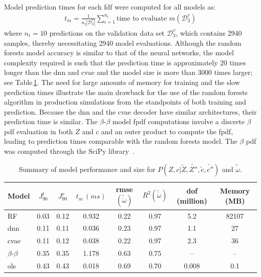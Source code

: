 \documentclass[review]{elsarticle}
\newcommand{\wt}[1]{\widetilde{#1}}
\begin{document}
Model prediction times for each \gls{fdf} were computed for all
models as:
\begin{align}
  \label{eq:predict}
  t_m = \frac{1}{n_t |\mathcal{D}_3^v|} \sum_{i=1}^{n_t} \text{time to evaluate } m(\mathcal{D}_3^v)
\end{align}
where $n_t=10$ predictions on the validation data set
$\mathcal{D}_3^v$, which contains 2940 samples, thereby necessitating
2940 model evaluations. Although the random forests model accuracy is
similar to that of the neural networks, the model complexity required
is such that the prediction time is approximately 20 times longer than
the \gls{dnn} and \gls{cvae} and the model size is more than 3000 times
larger; see Table\,\ref{tab:summary}. The need for large amounts of memory
for training and the slow prediction times illustrate the main
drawback for the use of the random forests algorithm in production
simulations from the standpoints of both training and prediction. Because the
\gls{dnn} and the \gls{cvae} decoder have similar architectures, their
prediction time is similar. The $\beta$-$\beta$ model 
\gls{fpdf} computations involve a discrete $\beta$ \gls{pdf} evaluation
in both $Z$ and $c$ and an outer product to compute the 
\gls{fpdf}, leading to prediction times comparable with the random
forests model. The $\beta$ \gls{pdf} was computed through the SciPy
library~\cite{Jones2001}.

\begin{table}[!tbp]
  \centering
  \begin{tabular}{lccccccc}
    \toprule
    Model & $J^t_{90}$ & $J^v_{90}$ & $t_m\,(\unit{ms})$ & \gls{rmse}$(\wt{\dot{\omega}})$& $R^2(\wt{\dot{\omega}})$ & \gls{dof} (million)& Memory (MB)\\
    \midrule
    RF            & 0.03 & 0.12 & 0.932 & 0.22 & 0.97 & 5.2 & 82107 \\
    \gls{dnn}     & 0.11 & 0.11 & 0.036 & 0.23 & 0.97 & 1.1 & 27 \\
    \gls{cvae}    & 0.11 & 0.12 & 0.038 & 0.22 & 0.97 & 2.3 & 36 \\
    $\beta$-$\beta$ & 0.35 & 0.35 & 1.178 & 0.63 & 0.75 & {--} & {--} \\
    \gls{ols}     & 0.43 & 0.43 & 0.018 & 0.69 & 0.70 & 0.008 & 0.1 \\
    \bottomrule
  \end{tabular}
  \caption{Summary of model performance and size for $P(Z,c | \wt{Z}, \wt{Z''}, \wt{c}, \wt{c''})$ and $\wt{\dot{\omega}}$.}\label{tab:summary}
\end{table}
\end{document}
